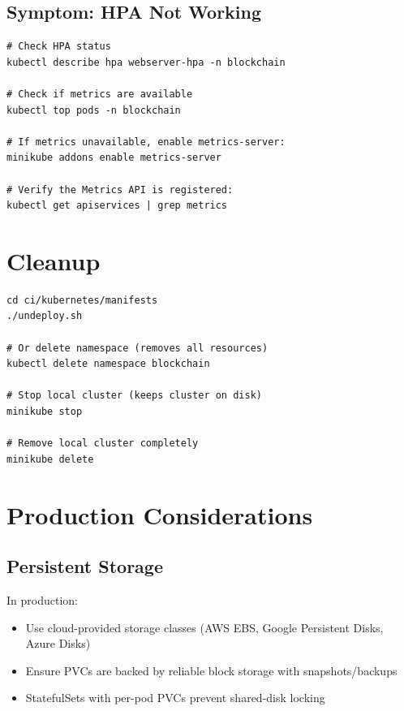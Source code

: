 \subsection{Symptom: HPA Not Working}

\begin{listing}[H]
\caption{Debug HPA Issues}
\label{lst:ch23-hpa-debug}
\begin{verbatim}
# Check HPA status
kubectl describe hpa webserver-hpa -n blockchain

# Check if metrics are available
kubectl top pods -n blockchain

# If metrics unavailable, enable metrics-server:
minikube addons enable metrics-server

# Verify the Metrics API is registered:
kubectl get apiservices | grep metrics
\end{verbatim}
\end{listing}

\section{Cleanup}
\label{sec:k8s-cleanup}

\begin{listing}[H]
\caption{Delete Kubernetes Deployment}
\label{lst:ch23-cleanup}
\begin{verbatim}
cd ci/kubernetes/manifests
./undeploy.sh

# Or delete namespace (removes all resources)
kubectl delete namespace blockchain

# Stop local cluster (keeps cluster on disk)
minikube stop

# Remove local cluster completely
minikube delete
\end{verbatim}
\end{listing}

\section{Production Considerations}
\label{sec:k8s-production}

\subsection{Persistent Storage}

In production:
\begin{itemize}
  \item Use cloud-provided storage classes (AWS EBS, Google Persistent Disks, Azure Disks)
  \item Ensure PVCs are backed by reliable block storage with snapshots/backups
  \item StatefulSets with per-pod PVCs prevent shared-disk locking
\end{itemize}


